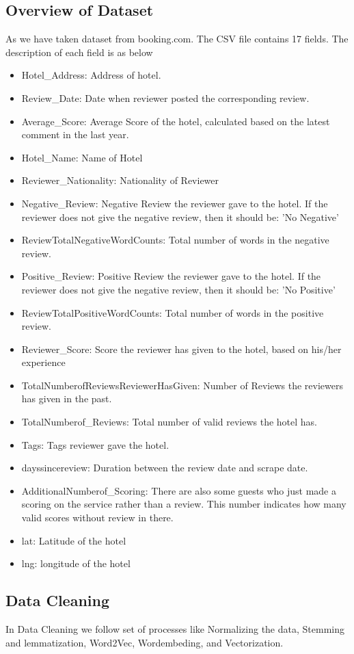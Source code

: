 \subsection{Overview of Dataset}
As we have taken dataset from booking.com. The CSV file contains 17 fields. The description of each field is as below
\begin{itemize}
\item Hotel\_Address: Address of hotel.
\item Review\_Date: Date when reviewer posted the corresponding review.
\item Average\_Score: Average Score of the hotel, calculated based on the latest comment in the last year.
\item Hotel\_Name: Name of Hotel
\item Reviewer\_Nationality: Nationality of Reviewer
\item Negative\_Review: Negative Review the reviewer gave to the hotel. If the reviewer does not give the negative review, then it should be: 'No Negative'
\item ReviewTotalNegativeWordCounts: Total number of words in the negative review.
\item Positive\_Review: Positive Review the reviewer gave to the hotel. If the reviewer does not give the negative review, then it should be: 'No Positive'
\item ReviewTotalPositiveWordCounts: Total number of words in the positive review.
\item Reviewer\_Score: Score the reviewer has given to the hotel, based on his/her experience
\item TotalNumberofReviewsReviewerHasGiven: Number of Reviews the reviewers has given in the past.
\item TotalNumberof\_Reviews: Total number of valid reviews the hotel has.
\item Tags: Tags reviewer gave the hotel.
\item dayssincereview: Duration between the review date and scrape date.
\item AdditionalNumberof\_Scoring: There are also some guests who just made a scoring on the service rather than a review. This number indicates how many valid scores without review in there.
\item lat: Latitude of the hotel
\item lng: longitude of the hotel
\end{itemize}
\subsection{Data Cleaning}
In Data Cleaning we follow set of processes like Normalizing the data, Stemming and lemmatization, Word2Vec, Wordembeding, and Vectorization.

